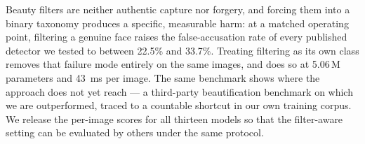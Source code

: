 \documentclass[conference]{IEEEtran}
\begin{document}
Beauty filters are neither authentic capture nor forgery, and forcing them into a binary
taxonomy produces a specific, measurable harm: at a matched operating point, filtering a
genuine face raises the false-accusation rate of every published detector we tested to
between 22.5\% and 33.7\%. Treating filtering as its own class removes that failure mode
entirely on the same images, and does so at 5.06\,M parameters and \SI{43}{\milli\second}
per image. The same benchmark shows where the approach does not yet reach --- a third-party
beautification benchmark on which we are outperformed, traced to a countable shortcut in
our own training corpus. We release the per-image scores for all thirteen models so that
the filter-aware setting can be evaluated by others under the same protocol.

\end{document}
